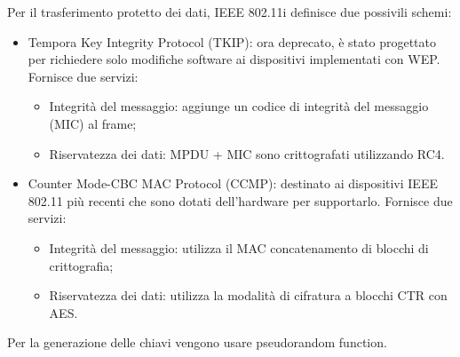 Per il trasferimento protetto dei dati, IEEE 802.11i definisce due possivili schemi:
\begin{itemize}
    \item Tempora Key Integrity Protocol (TKIP): ora deprecato, è stato progettato per richiedere solo modifiche software ai dispositivi implementati con WEP. Fornisce due servizi:
	\begin{itemize}
	    \item Integrità del messaggio: aggiunge un codice di integrità del messaggio (MIC) al frame;
		\item Riservatezza dei dati: MPDU + MIC sono crittografati utilizzando RC4.
	\end{itemize}
	\item Counter Mode-CBC MAC Protocol (CCMP): destinato ai dispositivi IEEE 802.11 più recenti che sono dotati dell'hardware per supportarlo. Fornisce due servizi:
	\begin{itemize}
	    \item Integrità del messaggio: utilizza il MAC concatenamento di blocchi di crittografia;
		\item Riservatezza dei dati: utilizza la modalità di cifratura a blocchi CTR con AES.
	\end{itemize}
\end{itemize}

Per la generazione delle chiavi vengono usare pseudorandom function.
